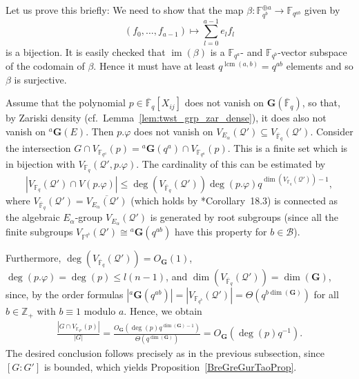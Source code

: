 \documentclass[a4paper,12pt]{amsproc}
\newcommand{\card}[1]{\left\lvert#1\right\rvert}%
\DeclareMathOperator{\im}{im}
\DeclareMathOperator{\lcm}{lcm}
\theoremstyle{plain}
\theoremstyle{definition}
\begin{document}
Let us prove this briefly: We need to show that the map $\beta\colon\mathbb{F}_{q^b}^{\oplus a}\to\mathbb{F}_{q^{ab}}$ given by 
$$
(f_0,\ldots,f_{a-1})\mapsto\sum_{l=0}^{a-1}{e_lf_l}
$$ 
is a bijection. It is easily checked that $\im(\beta)$ is a $\mathbb{F}_{q^a}$- and $\mathbb{F}_{q ^b}$-vector subspace of the codomain of $\beta$. Hence it must have at least $q^{\lcm(a,b)}=q^{ab}$ elements and so $\beta$ is surjective.

\medskip

Assume that the polynomial $p\in\overline{\mathbb{F}}_q[X_{ij}]$ does not vanish on $\mathbf{G}(\overline{\mathbb{F}}_q)$, so that, by Zariski density (cf.\ Lemma~\ref{lem:twst_grp_zar_dense}), it does also not vanish on ${}^a\mathbf{G}(E)$. Then $p.\varphi$ does not vanish on $V_{E_\alpha}(\mathcal{Q}')\subseteq V_{\overline{\mathbb{F}}_q}(\mathcal{Q}')$.
Consider the intersection $G\cap V_{\mathbb{F}_{q^a}}(p)={}^a\mathbf{G}(q^a)\cap V_{\mathbb{F}_{q^a}}(p)$. This is a finite set which is in bijection with $V_{\mathbb{F}_q}(\mathcal{Q}',p.\varphi)$. The cardinality of this can be estimated by 
$$
\card{V_{\mathbb{F}_q}(\mathcal{Q}')\cap V(p.\varphi)}\leq\deg(V_{\overline{\mathbb{F}}_q}(\mathcal{Q}'))\deg(p.\varphi)q^{\dim(V_{\overline{\mathbb{F}}_q}(\mathcal{Q}'))-1},
$$
where $V_{\overline{\mathbb{F}}_q}(\mathcal{Q}')=\overline{V_{E_\alpha}(\mathcal{Q}')}$ (which holds by \cite{borel2012linear}*{Corollary~18.3}) is connected as the algebraic $E_\alpha$-group $V_{E_\alpha}(\mathcal{Q}')$ is generated by root subgroups (since all the finite subgroups $V_{\mathbb{F}^{q^b}}(\mathcal{Q}')\cong{}^a\mathbf{G}(q^{ab})$ have this property for $b\in\mathcal{B}$). 
		
Furthermore, $\deg(V_{\overline{\mathbb{F}}_q}(\mathcal{Q}'))=O_{\mathbf{G}}(1)$, $\deg(p.\varphi)=\deg(p)\leq l(n-1)$, and $\dim(V_{\overline{\mathbb{F}}_q}(\mathcal{Q}'))=\dim(\mathbf{G})$, since, by the order formulas
$\card{{}^a\mathbf{G}(q^{ab})}=
\card{V_{\mathbb{F}_{q^b}}(\mathcal{Q}')}=\Theta(q^{b\dim(\mathbf{G})})$
for all $b\in\mathbb{Z}_+$ with $b\equiv 1$ modulo $a$. Hence, we obtain 
\begin{align*}
\frac{\card{G\cap V_{\mathbb{F}_{q^a}}(p)}}{\card{G}}=\frac{O_{\mathbf{G}}(\deg(p) q^{\dim(\mathbf{G})-1})}{\Theta(q^{\dim(\mathbf{G})})}=O_{\mathbf{G}}(\deg(p)q^{-1}).
\end{align*}
The desired conclusion follows precisely as in the previous subsection, since $[G:G']$ is bounded, which yields Proposition~\ref{BreGreGurTaoProp}.
\end{document}
